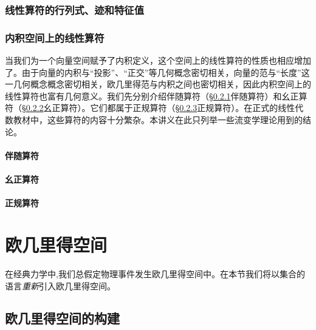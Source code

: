 \documentclass[zihao=-4,linespread=1.5,a4paper,heading=true,twoside]{ctexbook}
\theoremstyle{definition}
\theoremstyle{plain}
\begin{document}
\subsection{线性算符的行列式、迹和特征值}\label{sec:II.2.4.1}


\subsection{内积空间上的线性算符}\label{sec:II.2.4.2}
当我们为一个向量空间赋予了内积定义，这个空间上的线性算符的性质也相应增加了。由于向量的内积与“投影”、“正交”等几何概念密切相关，向量的范与“长度”这一几何概念概念密切相关，欧几里得范与内积之间也密切相关，因此内积空间上的线性算符也富有几何意义。我们先分别介绍伴随算符（\S \ref{sec:II.2.4.2_adjoint}伴随算符）和幺正算符（\S \ref{sec:II.2.4.2_unitary}幺正算符）。它们都属于正规算符（\S \ref{sec:II.2.4.2_normal}正规算符）。在正式的线性代数教材中，这些算符的内容十分繁杂。本讲义在此只列举一些流变学理论用到的结论。

\subsubsection{伴随算符}\label{sec:II.2.4.2_adjoint}

\subsubsection{幺正算符}\label{sec:II.2.4.2_unitary}

\subsubsection{正规算符}\label{sec:II.2.4.2_normal}




\chapter{欧几里得空间}
在经典力学中,我们总假定物理事件发生欧几里得空间中。在本节我们将以集合的语言\emph{重新}引入欧几里得空间。
\section{欧几里得空间的构建}\label{sec:II.3.1}

\end{document}
